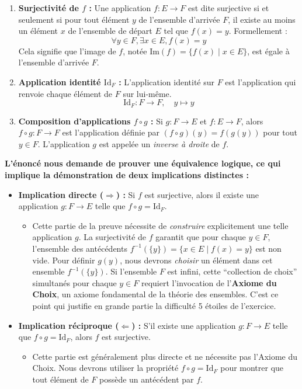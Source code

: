 \documentclass[12pt,a4paper]{report}
\providecommand{\tightlist}{%
  \setlength{\itemsep}{0pt}\setlength{\parskip}{0pt}}
\begin{document}
\begin{enumerate}
\def\labelenumi{\arabic{enumi}.}
\item
  \textbf{Surjectivité de \(f\) :} Une application \(f: E \to F\) est
  dite surjective si et seulement si pour tout élément \(y\) de
  l'ensemble d'arrivée \(F\), il existe au moins un élément \(x\) de
  l'ensemble de départ \(E\) tel que \(f(x) = y\). Formellement : \[
  \forall y \in F, \exists x \in E, f(x) = y
  \] Cela signifie que l'image de \(f\), notée
  \(\text{Im}(f) = \{f(x) \mid x \in E\}\), est égale à l'ensemble
  d'arrivée \(F\).
\item
  \textbf{Application identité \(\text{Id}_F\) :} L'application identité
  sur \(F\) est l'application qui renvoie chaque élément de \(F\) sur
  lui-même. \[
  \text{Id}_F: F \to F, \quad y \mapsto y
  \]
\item
  \textbf{Composition d'applications \(f \circ g\) :} Si \(g: F \to E\)
  et \(f: E \to F\), alors \(f \circ g: F \to F\) est l'application
  définie par \((f \circ g)(y) = f(g(y))\) pour tout \(y \in F\).
  L'application \(g\) est appelée un \emph{inverse à droite} de \(f\).
\end{enumerate}

\textbf{L'énoncé nous demande de prouver une équivalence logique, ce qui
implique la démonstration de deux implications distinctes :}

\begin{itemize}
\tightlist
\item
  \textbf{Implication directe (\(\Rightarrow\)) :} Si \(f\) est
  surjective, alors il existe une application \(g: F \to E\) telle que
  \(f \circ g = \text{Id}_F\).

  \begin{itemize}
  \tightlist
  \item
    Cette partie de la preuve nécessite de \emph{construire}
    explicitement une telle application \(g\). La surjectivité de \(f\)
    garantit que pour chaque \(y \in F\), l'ensemble des antécédents
    \(f^{-1}(\{y\}) = \{x \in E \mid f(x) = y\}\) est non vide. Pour
    définir \(g(y)\), nous devrons \emph{choisir} un élément dans cet
    ensemble \(f^{-1}(\{y\})\). Si l'ensemble \(F\) est infini, cette
    ``collection de choix'' simultanés pour chaque \(y \in F\) requiert
    l'invocation de l'\textbf{Axiome du Choix}, un axiome fondamental de
    la théorie des ensembles. C'est ce point qui justifie en grande
    partie la difficulté 5 étoiles de l'exercice.
  \end{itemize}
\item
  \textbf{Implication réciproque (\(\Leftarrow\)) :} S'il existe une
  application \(g: F \to E\) telle que \(f \circ g = \text{Id}_F\),
  alors \(f\) est surjective.

  \begin{itemize}
  \tightlist
  \item
    Cette partie est généralement plus directe et ne nécessite pas
    l'Axiome du Choix. Nous devrons utiliser la propriété
    \(f \circ g = \text{Id}_F\) pour montrer que tout élément de \(F\)
    possède un antécédent par \(f\).
  \end{itemize}
\end{itemize}
\end{document}
